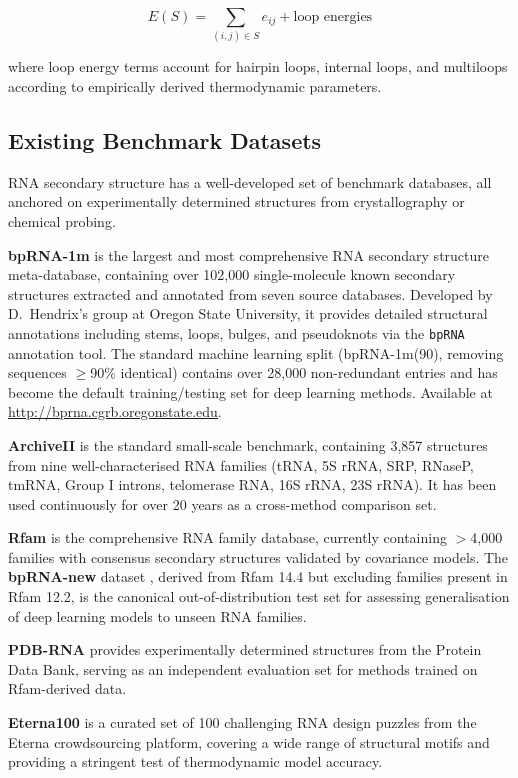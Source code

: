 \documentclass[11pt]{article}
\begin{document}
\[
E(S) = \sum_{(i,j)\in S} e_{ij} + \text{loop energies}
\]

where loop energy terms account for hairpin loops, internal loops, and multiloops
according to empirically derived thermodynamic parameters.

\subsection*{Existing Benchmark Datasets}

RNA secondary structure has a well-developed set of benchmark databases, all anchored
on experimentally determined structures from crystallography or chemical probing.

\textbf{bpRNA-1m} \cite{Danaee2018} is the largest and most comprehensive RNA secondary
structure meta-database, containing over 102{,}000 single-molecule known secondary
structures extracted and annotated from seven source databases. Developed by D.~Hendrix's
group at Oregon State University, it provides detailed structural annotations including
stems, loops, bulges, and pseudoknots via the \texttt{bpRNA} annotation tool. The
standard machine learning split (bpRNA-1m(90), removing sequences $\ge$90\% identical)
contains over 28{,}000 non-redundant entries and has become the default training/testing
set for deep learning methods. Available at \url{http://bprna.cgrb.oregonstate.edu}.

\textbf{ArchiveII} \cite{Mathews2004} is the standard small-scale benchmark, containing
3{,}857 structures from nine well-characterised RNA families (tRNA, 5S rRNA, SRP,
RNaseP, tmRNA, Group I introns, telomerase RNA, 16S rRNA, 23S rRNA). It has been
used continuously for over 20 years as a cross-method comparison set.

\textbf{Rfam} \cite{Rfam} is the comprehensive RNA family database, currently containing
$>$4{,}000 families with consensus secondary structures validated by covariance models.
The \textbf{bpRNA-new} dataset \cite{MXfold22021}, derived from Rfam 14.4 but excluding
families present in Rfam 12.2, is the canonical out-of-distribution test set for
assessing generalisation of deep learning models to unseen RNA families.

\textbf{PDB-RNA} provides experimentally determined structures from the Protein Data Bank,
serving as an independent evaluation set for methods trained on Rfam-derived data.

\textbf{Eterna100} \cite{Wayment2022} is a curated set of 100 challenging RNA design
puzzles from the Eterna crowdsourcing platform, covering a wide range of structural
motifs and providing a stringent test of thermodynamic model accuracy.
\end{document}
